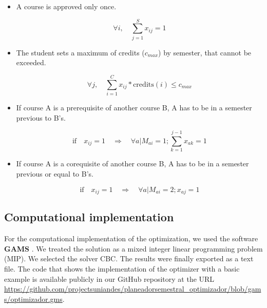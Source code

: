 \documentclass[journal]{IEEEtran}
\begin{document}
\begin{itemize}
    \item A course is approved only once.
    
    \begin{equation}
        \label{noRepeats}
        \forall i, \quad \displaystyle\sum_{j=1}^{S} x_{ij} = 1
    \end{equation}
    
    \item The student sets a maximum of credits ($c_{max}$) by semester, that cannot be exceeded.
    
    \begin{equation}
        \label{maxCredits}
        \forall j, \quad \displaystyle\sum_{i=1}^{C} x_{ij} * \mathrm{credits}(i) \leq c_{max}
    \end{equation}
    
    \item If course A is a prerequisite of another course B, A has to be in a semester previous to B's.
    
    \begin{equation}
        \label{prereq}
        \textrm{if} \quad x_{ij} =1 \quad \Rightarrow \quad \forall a | M_{ai} = 1; \sum_{k=1}^{j-1} x_{ak} = 1
    \end{equation}
    
    \item If course A is a corequisite of another course B, A has to be in a semester previous or equal to B's.
    
    \begin{equation}
        \label{correq}
        \textrm{if} \quad x_{ij} =1 \quad \Rightarrow \quad \forall a | M_{ai} = 2; x_{aj} = 1
    \end{equation}
    
\end{itemize}

\subsection{Computational implementation}

For the computational implementation of the optimization, we used the software \textbf{GAMS} \cite{gams}. We treated the solution as a mixed integer linear programming problem (MIP). We selected the solver CBC. The results were finally exported as a text file. The code that shows the implementation of the optimizer with a basic example is available publicly in our GitHub repository at the URL  \url{https://github.com/projectsuniandes/planeadorsemestral_optimizador/blob/gams/optimizador.gms}.\\
\end{document}
